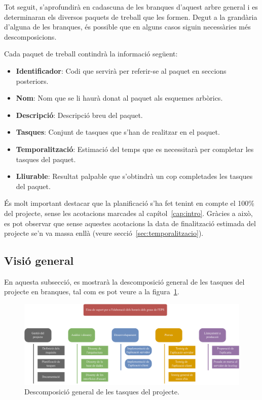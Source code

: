 \documentclass[a4paper,12pt]{ThesisStyle}
\begin{document}
Tot seguit, s'aprofundirà en cadascuna de les branques d'aquest arbre general i es determinaran els diversos paquets de treball que les formen. Degut a la grandària d'alguna de les branques, és possible que en alguns casos siguin necessàries més descomposicions.

Cada paquet de treball contindrà la informació següent:
\begin{itemize}
  \item \textbf{Identificador}: Codi que servirà per referir-se al paquet en seccions posteriors.
  \item \textbf{Nom}: Nom que se li haurà donat al paquet als esquemes arbòrics.
  \item \textbf{Descripció}: Descripció breu del paquet.
  \item \textbf{Tasques}: Conjunt de tasques que s'han de realitzar en el paquet.
  \item \textbf{Temporalització}: Estimació del temps que es necessitarà per completar les tasques del paquet.
  \item \textbf{Lliurable}: Resultat palpable que s'obtindrà un cop completades les tasques del paquet.
\end{itemize}

És molt important destacar que la planificació s'ha fet tenint en compte el 100\% del projecte, sense les acotacions marcades al capítol~\ref{cap:intro}. Gràcies a això, es pot observar que sense aquestes acotacions la data de finalització estimada del projecte se'n va massa enllà (veure secció~\ref{sec:temporalitzacio}).

\subsection{Visió general}
\label{subsec:visio_general}

En aquesta subsecció, es mostrarà la descomposició general de les tasques del projecte en branques, tal com es pot veure a la figura~\ref{img:pt_general}.

\begin{figure}[H]
	\centering
	\includegraphics[width=\textwidth]{assets/working_packages/general.pdf}
	\caption{\label{img:pt_general}Descomposició general de les tasques del projecte.}
\end{figure}
\end{document}

